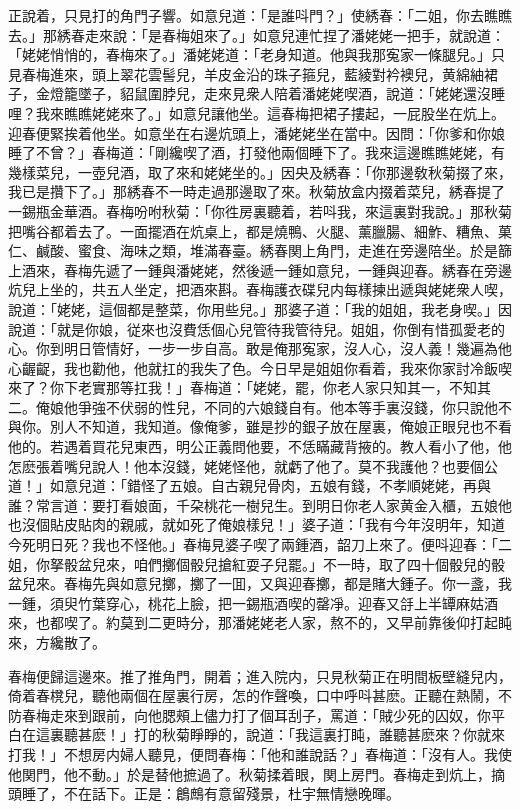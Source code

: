 正說着，只見打的角門子響。如意兒道：「是誰呌門？」使綉春：「二姐，你去瞧瞧去。」那綉春走來說：「是春梅姐來了。」如意兒連忙捏了潘姥姥一把手，就說道：「姥姥悄悄的，春梅來了。」潘姥姥道：「老身知道。他與我那寃家一條腿兒。」只見春梅進來，頭上翠花雲髻兒，羊皮金沿的珠子箍兒，藍綾對衿襖兒，黄綿紬裙子，金燈籠墜子，貂鼠圍脖兒，走來見衆人陪着潘姥姥喫酒，說道：「姥姥還沒睡哩？我來瞧瞧姥姥來了。」如意兒讓他坐。這春梅把裙子摟起，一屁股坐在炕上。迎春便緊挨着他坐。如意坐在右邊炕頭上，潘姥姥坐在當中。因問：「你爹和你娘睡了不曾？」春梅道：「剛纔喫了酒，打發他兩個睡下了。我來這邊瞧瞧姥姥，有幾樣菜兒，一壺兒酒，取了來和姥姥坐的。」因央及綉春：「你那邊敎秋菊掇了來，我已是攢下了。」那綉春不一時走過那邊取了來。秋菊放盒内掇着菜兒，綉春提了一錫瓶金華酒。春梅吩咐秋菊：「你徃房裏聽着，若呌我，來這裏對我說。」那秋菊把嘴谷都着去了。一面擺酒在炕桌上，都是燒鴨、火腿、薰臘腸、細鮓、糟魚、菓仁、鹹酸、蜜食、海味之類，堆滿春臺。綉春関上角門，走進在旁邊陪坐。於是篩上酒來，春梅先遞了一鍾與潘姥姥，然後遞一鍾如意兒，一鍾與迎春。綉春在旁邊炕兒上坐的，共五人坐定，把酒來斟。春梅護衣碟兒内每樣揀出遞與姥姥衆人喫，說道：「姥姥，這個都是整菜，你用些兒。」那婆子道：「我的姐姐，我老身喫。」因說道：「就是你娘，従來也沒費恁個心兒管待我管待兒。姐姐，你倒有惜孤愛老的心。你到明日管情好，一步一步自高。敢是俺那寃家，沒人心，沒人義！幾遍為他心齷齪，我也勸他，他就扛的我失了色。今日早是姐姐你看着，我來你家討冷飯喫來了？你下老實那等扛我！」春梅道：「姥姥，罷，你老人家只知其一，不知其二。俺娘他爭強不伏弱的性兒，不同的六娘錢自有。他本等手裏沒錢，你只說他不與你。別人不知道，我知道。像俺爹，雖是抄的銀子放在屋裏，俺娘正眼兒也不看他的。若遇着買花兒東西，明公正義問他要，不恁瞞藏背掖的。教人看小了他，他怎麽張着嘴兒說人！他本沒錢，姥姥怪他，就虧了他了。莫不我護他？也要個公道！」如意兒道：「錯怪了五娘。自古親兒骨肉，五娘有錢，不孝順姥姥，再與誰？常言道：要打看娘面，千朶桃花一樹兒生。到明日你老人家黄金入櫃，五娘他也沒個貼皮貼肉的親戚，就如死了俺娘樣兒！」婆子道：「我有今年沒明年，知道今死明日死？我也不怪他。」春梅見婆子喫了兩鍾酒，韶刀上來了。便呌迎春：「二姐，你拏骰盆兒來，咱們擲個骰兒搶紅耍子兒罷。」不一時，取了四十個骰兒的骰盆兒來。春梅先與如意兒擲，擲了一囬，又與迎春擲，都是賭大鍾子。你一盞，我一鍾，須臾竹葉穿心，桃花上臉，把一錫瓶酒喫的罄凈。迎春又㧱上半罈麻姑酒來，也都喫了。約莫到二更時分，那潘姥姥老人家，熬不的，又早前靠後仰打起盹來，方纔散了。

春梅便歸這邊來。推了推角門，開着；進入院内，只見秋菊正在明間板壁縫兒内，倚着春櫈兒，聽他兩個在屋裏行房，怎的作聲喚，口中呼呌甚麽。正聽在熱鬧，不防春梅走來到跟前，向他腮頰上儘力打了個耳刮子，罵道：「賊少死的囚奴，你平白在這裏聽甚麽！」打的秋菊睜睜的，說道：「我這裏打盹，誰聽甚麽來？你就來打我！」不想房内婦人聽見，便問春梅：「他和誰說話？」春梅道：「沒有人。我使他関門，他不動。」於是替他摭過了。秋菊揉着眼，関上房門。春梅走到炕上，摘頭睡了，不在話下。正是：鶬鷓有意留殘景，杜宇無情戀晚暉。


